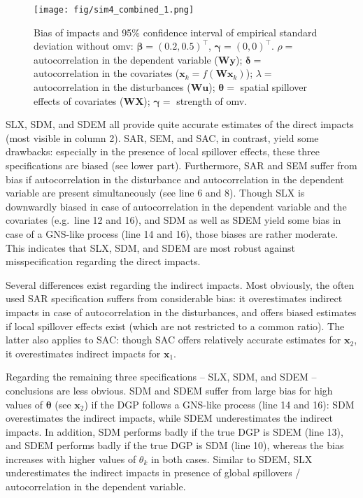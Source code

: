 \documentclass[
  letterpaper,
]{scrbook}
\begin{document}
\begin{figure}

{\centering \texttt{[image: fig/sim4\_combined\_1.png]}

}

\caption{Bias of impacts and 95\% confidence interval of empirical
standard deviation without omv:
\({\boldsymbol{\mathbf{\beta}}}=(0.2, 0.5)^\intercal\),
\({\boldsymbol{\mathbf{\gamma}}}=(0, 0)^\intercal\). \(\rho=\)
autocorrelation in the dependent variable
(\(\boldsymbol{\mathbf{W}} \boldsymbol{\mathbf{y}}\));
\(\boldsymbol{\mathbf{\delta}}=\) autocorrelation in the covariates
(\(\boldsymbol{\mathbf{x}}_k = f(\boldsymbol{\mathbf{W}} \boldsymbol{\mathbf{x}}_k)\));
\(\lambda=\) autocorrelation in the disturbances
(\(\boldsymbol{\mathbf{W}} \boldsymbol{\mathbf{u}}\));
\(\boldsymbol{\mathbf{\theta}}=\) spatial spillover effects of
covariates (\(\boldsymbol{\mathbf{W}} \boldsymbol{\mathbf{X}}\));
\(\boldsymbol{\mathbf{\gamma}}=\) strength of omv.}

\end{figure}

SLX, SDM, and SDEM all provide quite accurate estimates of the direct
impacts (most visible in column 2). SAR, SEM, and SAC, in contrast,
yield some drawbacks: especially in the presence of local spillover
effects, these three specifications are biased (see lower part).
Furthermore, SAR and SEM suffer from bias if autocorrelation in the
disturbance and autocorrelation in the dependent variable are present
simultaneously (see line 6 and 8). Though SLX is downwardly biased in
case of autocorrelation in the dependent variable and the covariates
(e.g.~line 12 and 16), and SDM as well as SDEM yield some bias in case
of a GNS-like process (line 14 and 16), those biases are rather
moderate. This indicates that SLX, SDM, and SDEM are most robust against
misspecification regarding the direct impacts.

Several differences exist regarding the indirect impacts. Most
obviously, the often used SAR specification suffers from considerable
bias: it overestimates indirect impacts in case of autocorrelation in
the disturbances, and offers biased estimates if local spillover effects
exist (which are not restricted to a common ratio). The latter also
applies to SAC: though SAC offers relatively accurate estimates for
\({\boldsymbol{\mathbf{x}}}_2\), it overestimates indirect impacts for
\({\boldsymbol{\mathbf{x}}}_1\).

Regarding the remaining three specifications -- SLX, SDM, and SDEM --
conclusions are less obvious. SDM and SDEM suffer from large bias for
high values of \({\boldsymbol{\mathbf{\theta}}}\) (see
\(\boldsymbol{\mathbf{x}}_2\)) if the DGP follows a GNS-like process
(line 14 and 16): SDM overestimates the indirect impacts, while SDEM
underestimates the indirect impacts. In addition, SDM performs badly if
the true DGP is SDEM (line 13), and SDEM performs badly if the true DGP
is SDM (line 10), whereas the bias increases with higher values of
\(\theta_k\) in both cases. Similar to SDEM, SLX underestimates the
indirect impacts in presence of global spillovers / autocorrelation in
the dependent variable.
\end{document}
